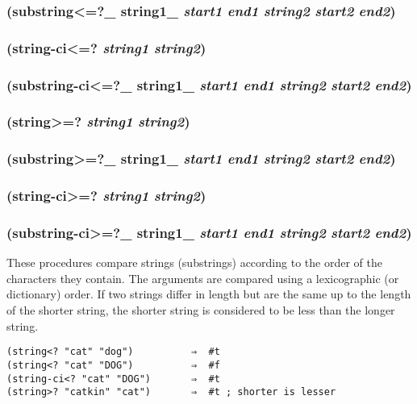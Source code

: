 \documentclass{article}
\begin{document}
\subsubsection{(substring\textless{}=?\_ string1\_ \emph{start1} \emph{end1} \emph{string2} \emph{start2} \emph{end2})}

\subsubsection{(string-ci\textless{}=? \emph{string1} \emph{string2})}

\subsubsection{(substring-ci\textless{}=?\_ string1\_ \emph{start1} \emph{end1} \emph{string2} \emph{start2} \emph{end2})}

\subsubsection{(string\textgreater{}=? \emph{string1} \emph{string2})}

\subsubsection{(substring\textgreater{}=?\_ string1\_ \emph{start1} \emph{end1} \emph{string2} \emph{start2} \emph{end2})}

\subsubsection{(string-ci\textgreater{}=? \emph{string1} \emph{string2})}

\subsubsection{(substring-ci\textgreater{}=?\_ string1\_ \emph{start1} \emph{end1} \emph{string2} \emph{start2} \emph{end2})}

These procedures compare strings (substrings) according to the order of the characters they
contain. The arguments are compared using a lexicographic (or dictionary) order. If two
strings differ in length but are the same up to the length of the shorter string, the shorter
string is considered to be less than the longer string.

\begin{verbatim}
(string<? "cat" "dog")          ⇒  #t
(string<? "cat" "DOG")          ⇒  #f
(string-ci<? "cat" "DOG")       ⇒  #t
(string>? "catkin" "cat")       ⇒  #t ; shorter is lesser
\end{verbatim}
\end{document}
